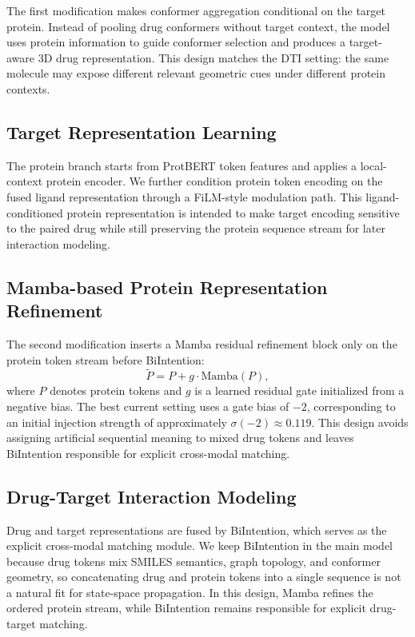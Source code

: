 The first modification makes conformer aggregation conditional on the target protein. Instead of pooling drug conformers without target context, the model uses protein information to guide conformer selection and produces a target-aware 3D drug representation. This design matches the DTI setting: the same molecule may expose different relevant geometric cues under different protein contexts.

\subsection{Target Representation Learning}

The protein branch starts from ProtBERT token features and applies a local-context protein encoder. We further condition protein token encoding on the fused ligand representation through a FiLM-style modulation path. This ligand-conditioned protein representation is intended to make target encoding sensitive to the paired drug while still preserving the protein sequence stream for later interaction modeling.

\subsection{Mamba-based Protein Representation Refinement}

The second modification inserts a Mamba residual refinement block only on the protein token stream before BiIntention:
\[
  \tilde{P} = P + g \cdot \mathrm{Mamba}(P),
\]
where $P$ denotes protein tokens and $g$ is a learned residual gate initialized from a negative bias. The best current setting uses a gate bias of $-2$, corresponding to an initial injection strength of approximately $\sigma(-2)\approx0.119$. This design avoids assigning artificial sequential meaning to mixed drug tokens and leaves BiIntention responsible for explicit cross-modal matching.

\subsection{Drug-Target Interaction Modeling}

Drug and target representations are fused by BiIntention, which serves as the explicit cross-modal matching module. We keep BiIntention in the main model because drug tokens mix SMILES semantics, graph topology, and conformer geometry, so concatenating drug and protein tokens into a single sequence is not a natural fit for state-space propagation. In this design, Mamba refines the ordered protein stream, while BiIntention remains responsible for explicit drug-target matching.


